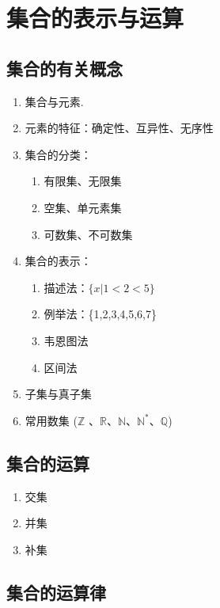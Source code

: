 \chapter{集合的表示与运算}
\section{集合的有关概念}
\begin{enumerate}
	\item 集合与元素.
	\item 元素的特征：确定性、互异性、无序性
	\item 集合的分类：\begin{enumerate}
		\item 有限集、无限集
		\item 空集、单元素集
		\item 可数集、不可数集
	\end{enumerate}
	\item 集合的表示：\begin{enumerate}
		\item 描述法：$ \{x|1<2<5\} $
		\item 例举法：\{1,2,3,4,5,6,7\}
		\item 韦恩图法
		\item 区间法  
	\end{enumerate}
	\item 子集与真子集
	\item 常用数集 ($\mathbb{Z}$ 、$\mathbb{R}$、$\mathbb{N}$、$\mathbb{N^*}$、$\mathbb{Q}$)
\end{enumerate}
\section{集合的运算}
\begin{enumerate}
	\item 交集
	\item 并集
	\item 补集
\end{enumerate}
\section{集合的运算律}
